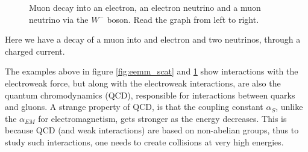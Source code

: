 \begin{figure}[h!]
    \centering
    \caption[Muon decay diagram]{Muon decay into an electron, an electron neutrino and a muon neutrino via the $W^{-}$ boson. Read the graph from left to right.}
    
    \label{fig:mw_decay}
\end{figure}

Here we have a decay of a muon into and electron and two neutrinos, through a charged current. \par 
The examples above in figure \ref{fig:eemm_scat} and \ref{fig:mw_decay} show interactions with 
the electroweak force, but along with the electroweak interactions, are also the quantum chromodynamics (QCD), 
responsible for interactions between quarks and gluons. A strange property of QCD,
is that the coupling constant $\alpha_{S}$, unlike the $\alpha_{EM}$ for electromagnetism,
gets stronger as the energy decreases. This is because QCD (and weak interactions) are based on non-abelian 
groups\cite{Peskin:1995ev}, thus to study such interactions, one needs to create collisions at very high energies. 


